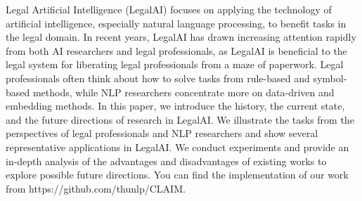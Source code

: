 Legal Artificial Intelligence (LegalAI) focuses on applying the technology of artificial intelligence, especially natural language processing, to benefit tasks in the legal domain. In recent years, LegalAI has drawn increasing attention rapidly from both AI researchers and legal professionals, as LegalAI is beneficial to the legal system for liberating legal professionals from a maze of paperwork. Legal professionals often think about how to solve tasks from rule-based and symbol-based methods, while NLP researchers concentrate more on data-driven and embedding methods. In this paper, we introduce the history, the current state, and the future directions of research in LegalAI. We illustrate the tasks from the perspectives of legal professionals and NLP researchers and show several representative applications in LegalAI. We conduct experiments and provide an in-depth analysis of the advantages and disadvantages of existing works to explore possible future directions. You can find the implementation of our work from https://github.com/thunlp/CLAIM.
